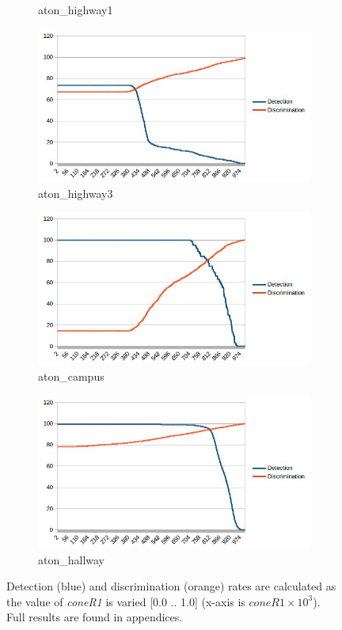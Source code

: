 \documentclass[12pt]{report}
\begin{document}
\begin{figure}
\begin{subfigure}{.49\linewidth}
  \caption{aton\_highway1}
\end{subfigure}
\hfill
\begin{subfigure}{.49\linewidth}
 \includegraphics[width=1\linewidth]{figures/highway3_coneR1_response.jpg}
  \caption{aton\_highway3}
\end{subfigure}
\hfill
\begin{subfigure}{.49\linewidth}
 \includegraphics[width=1\linewidth]{figures/campus_coneR1_response.jpg}
  \caption{aton\_campus}
\end{subfigure}
\hfill
\begin{subfigure}{.49\linewidth}
 \includegraphics[width=1\linewidth]{figures/hallway_coneR1_response.jpg}
  \caption{aton\_hallway}
\end{subfigure}

\caption{Detection (blue) and discrimination (orange) rates are calculated as the value of \textit{coneR1} is varied [0.0 .. 1.0] (x-axis is ${coneR1}\times10^{3}$). Full results are found in appendices.}
\label{fig:coneR1_iterate}
\end{figure}
\end{document}
